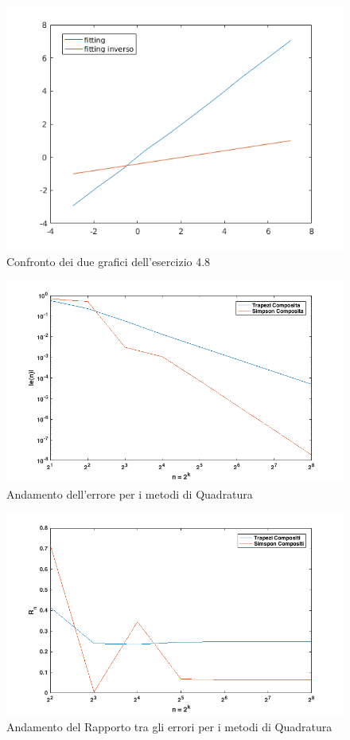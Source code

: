 \begin{figure}
\includegraphics[width=\textwidth]{cap_4/es10/untitled}
\caption{Confronto dei due grafici dell'esercizio 4.8}
\label{fitting}
\end{figure}

\begin{figure}
\includegraphics[width=\textwidth]{cap_5_6/es2/error.png}
\caption{Andamento dell'errore per i metodi di Quadratura}
\label{QuadrErr}
\end{figure}
\begin{figure}
\includegraphics[width=\textwidth]{cap_5_6/es2/rapp_err.png}
\caption{Andamento del Rapporto tra gli errori per i metodi di Quadratura}
\label{QuadrRapp}
\end{figure}

